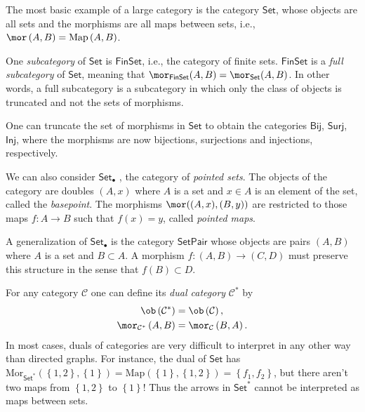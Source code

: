 \begin{example}
    The most basic example of a large category is the category $\mathsf{Set}$,
    whose objects are all sets and the morphisms are all maps between
    sets, i.e., $\mor\left(A,B\right)=\mathrm{Map}\left(A,B\right)$. 

    One \emph{subcategory} of $\mathsf{Set}$ is $\mathsf{FinSet}$,
    i.e., the category of finite sets. $\mathsf{FinSet}$ is a \emph{full
    subcategory} of $\mathsf{Set}$, meaning that $\mor_{\mathsf{FinSet}}(A,B)=\mor_{\mathsf{Set}}(A,B)$.
    In other words, a full subcategory is a subcategory in which only
    the class of objects is truncated and not the sets of morphisms.
\end{example}
%
\begin{example}
    One can truncate the set of morphisms in $\mathsf{Set}$ to obtain
    the categories $\mathsf{Bij}$, $\mathsf{Surj}$, $\mathsf{Inj}$,
    where the morphisms are now bijections, surjections and injections,
    respectively.
\end{example}
%
\begin{example}
    We can also consider $\mathsf{Set}_{\bullet}$ , the category of \emph{pointed sets}. The objects of the category are doubles $(A,x)$ where $A$
    is a set and $x\in A$ is an element of the set, called the \emph{basepoint}.
    The morphisms $\mor((A,x),(B,y))$ are restricted to those maps $f:A\rightarrow B$
    such that $f(x)=y$, called \emph{pointed maps}.
\end{example}
%
\begin{example}
A generalization of $\mathsf{Set}_{\bullet}$ is the category $\mathsf{SetPair}$
whose objects are pairs $(A,B)$ where $A$ is a set and $B\subset A$.
A morphism $f:(A,B)\rightarrow(C,D)$ must preserve this structure
in the sense that $f(B)\subset D$.
\end{example}
%
\begin{example}
For any category $\mathcal{C}$ one can define its \emph{dual category}
$\mathcal{C}^{\ast}$ by
\begin{align}
    \ob\left(\mathcal{C}^{\ast}\right) & =\ob\left(\mathcal{C}\right),\nonumber \\
    \mor_{\mathcal{C}^{\ast}}\left(A,B\right) & =\mor_{\mathcal{C}}\left(B,A\right).
\end{align}
In most cases, duals of categories are very difficult to interpret
in any other way than directed graphs. For instance, the dual of $\mathsf{Set}$
has $\mathrm{Mor}_{\mathsf{Set}^{\ast}}\left(\left\{ 1,2\right\} ,\left\{ 1\right\} \right)=\mathrm{Map}\left(\left\{ 1\right\} ,\left\{ 1,2\right\} \right)=\left\{ f_{1},f_{2}\right\} $,
but there aren't two maps from $\left\{ 1,2\right\} $ to $\left\{ 1\right\} $!
Thus the arrows in $\mathsf{Set}^{\ast}$ cannot be interpreted as
maps between sets.
\end{example}





